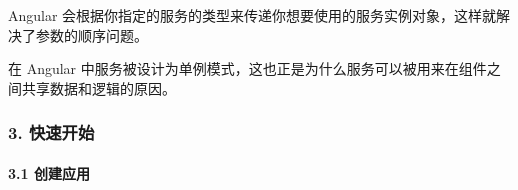 \documentclass[
]{article}
\begin{document}
Angular
会根据你指定的服务的类型来传递你想要使用的服务实例对象，这样就解决了参数的顺序问题。

在 Angular
中服务被设计为单例模式，这也正是为什么服务可以被用来在组件之间共享数据和逻辑的原因。

\hypertarget{3-ux5febux901fux5f00ux59cb}{%
\subsubsection{3. 快速开始}\label{3-ux5febux901fux5f00ux59cb}}

\hypertarget{31-ux521bux5efaux5e94ux7528}{%
\paragraph{3.1 创建应用}\label{31-ux521bux5efaux5e94ux7528}}
\end{document}
